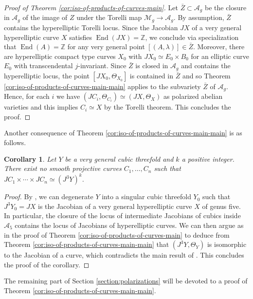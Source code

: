 \documentclass[a4paper,11pt,reqno]{amsart}
\numberwithin{equation}{section}
\theoremstyle{plain}
\newtheorem{corollary}[theorem]{Corollary}
\theoremstyle{definition}
\newcommand{\Z}{\mathbb Z}
\newcommand{\End}{\operatorname{End}}
\newcommand{\ca}[1]{{\mathcal{#1}}}
\renewcommand{\cong}{\simeq}
\begin{document}
\begin{proof}[Proof of Theorem \ref{cor:iso-of-products-of-curves-main}]
Let $\bar{Z}\subset \mathcal A_g$ be the closure in $\mathcal A_g$ of the image of $Z$ under the Torelli map $\ca M_g \to \ca A_g$. 
By assumption, $\bar{Z}$ contains the hyperelliptic Torelli locus. Since the Jacobian $JX$ of a very general hyperelliptic curve $X$ satisfies $\End(JX)=\Z$, we conclude via specialization that $\End(A)=\Z$ for any very general point $[(A,\lambda)]\in \bar{Z}$.
    Moreover, there are hyperelliptic compact type curves $X_0$ with $JX_0\cong E_0\times B_0$ for an elliptic curve $E_0$ with transcendental $j$-invariant.
    Since $\bar{Z}$ is closed in $\mathcal A_g$ and contains the hyperelliptic locus, the point $[JX_0,\Theta_{X_0}]$ is contained in $\bar{Z}$ and so Theorem \ref{cor:iso-of-products-of-curves-main-main} applies to the subvariety $\bar{Z}$ of $\mathcal A_g$. 
    Hence, for each $i$ we have $(JC_i,\Theta_{C_i}) \cong (JX,\Theta_X)$ as polarized abelian varieties and this implies $C_i\cong X$ by the Torelli theorem.
    This concludes the proof.
\end{proof}

Another consequence of Theorem \ref{cor:iso-of-products-of-curves-main-main} is as follows.

\begin{corollary} \label{cor:cubicthreefold-isomorphism}
Let $Y$ be a very general cubic threefold and $k$ a positive integer. There exist no smooth projective curves $C_1, \dotsc, C_n$ such that $JC_1 \times \cdots \times JC_n \cong (J^3Y)^k$. 
\end{corollary}
\begin{proof} 
By \cite[Theorem (0.1)]{collino-fanofundamentalgroup}, we can degenerate $Y$ into a singular cubic threefold $Y_0$ such that $J^3Y_0 = JX$ is the Jacobian of a very general hyperelliptic curve $X$ of genus five.
In particular, the closure of the locus of intermediate Jacobians of cubics inside $\mathcal A_5$ contains the locus of Jacobians of hyperelliptic curves.
We can then argue as in the proof of Theorem \ref{cor:iso-of-products-of-curves-main} to deduce from Theorem \ref{cor:iso-of-products-of-curves-main-main} that $(J^3Y,\Theta_Y)$ is isomorphic to the Jacobian of a curve, which contradicts the main result of  \cite{clemensgriffiths-cubicthreefold}.
This concludes the proof of the corollary.
\end{proof}

The remaining part of Section \ref{section:polarizations} will be devoted to a proof of Theorem \ref{cor:iso-of-products-of-curves-main-main}. 
 
\end{document}
